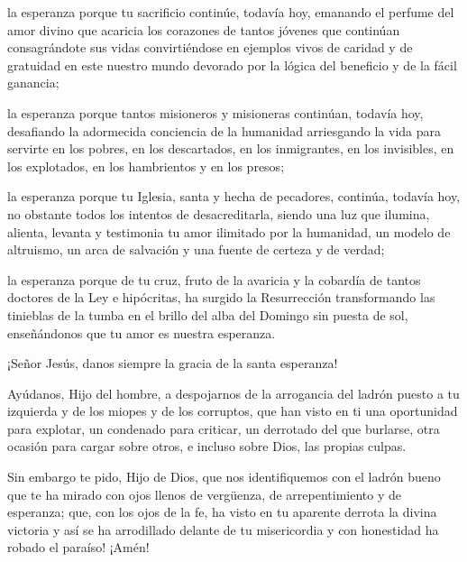			\begin{body}la esperanza porque tu sacrificio continúe, todavía hoy, emanando el perfume del amor divino que acaricia los corazones de tantos jóvenes que continúan consagrándote sus vidas convirtiéndose en ejemplos vivos de caridad y de gratuidad en este nuestro mundo devorado por la lógica del beneficio y de la fácil ganancia; \end{body}
			
			\begin{body}la esperanza porque tantos misioneros y misioneras continúan, todavía hoy, desafiando la adormecida conciencia de la humanidad arriesgando la vida para servirte en los pobres, en los descartados, en los inmigrantes, en los invisibles, en los explotados, en los hambrientos y en los presos; \end{body}
			
			\begin{body}la esperanza porque tu Iglesia, santa y hecha de pecadores, continúa, todavía hoy, no obstante todos los intentos de desacreditarla, siendo una luz que ilumina, alienta, levanta y testimonia tu amor ilimitado por la humanidad, un modelo de altruismo, un arca de salvación y una fuente de certeza y de verdad; \end{body}
			
			\begin{body}la esperanza porque de tu cruz, fruto de la avaricia y la cobardía de tantos doctores de la Ley e hipócritas, ha surgido la Resurrección transformando las tinieblas de la tumba en el brillo del alba del Domingo sin puesta de sol, enseñándonos que tu amor es nuestra esperanza. \end{body}
			
			\begin{body}¡Señor Jesús, danos siempre la gracia de la santa esperanza!\end{body}
			
			\begin{body}Ayúdanos, Hijo del hombre, a despojarnos de la arrogancia del ladrón puesto a tu izquierda y de los miopes y de los corruptos, que han visto en ti una oportunidad para explotar, un condenado para criticar, un derrotado del que burlarse, otra ocasión para cargar sobre otros, e incluso sobre Dios, las propias culpas. \end{body}
			
			\begin{body}Sin embargo te pido, Hijo de Dios, que nos identifiquemos con el ladrón bueno que te ha mirado con ojos llenos de vergüenza, de arrepentimiento y de esperanza; que, con los ojos de la fe, ha visto en tu aparente derrota la divina victoria y así se ha arrodillado delante de tu misericordia y con honestidad ha robado el paraíso! ¡Amén!\end{body}
			
